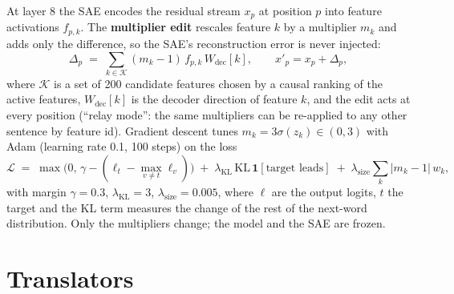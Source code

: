 At layer 8 the SAE encodes the residual stream $x_p$ at position $p$ into feature activations $f_{p,k}$. The \textbf{multiplier edit} rescales feature $k$ by a multiplier $m_k$ and adds only the difference, so the SAE's reconstruction error is never injected:
\begin{equation}\label{eq:delta}
\Delta_p \;=\; \sum_{k\in\mathcal{K}} (m_k - 1)\, f_{p,k}\, W_{\mathrm{dec}}[k], \qquad x'_p = x_p + \Delta_p ,
\end{equation}
where $\mathcal{K}$ is a set of 200 candidate features chosen by a causal ranking of the active features, $W_{\mathrm{dec}}[k]$ is the decoder direction of feature $k$, and the edit acts at every position (``relay mode'': the same multipliers can be re-applied to any other sentence by feature id). Gradient descent tunes $m_k = 3\sigma(z_k)\in(0,3)$ with Adam \cite{r36} (learning rate 0.1, 100 steps) on the loss
\begin{equation}\label{eq:loss}
\mathcal{L} \;=\; \max\!\bigl(0,\,\gamma - (\ell_t - \max_{v\neq t}\ell_v)\bigr) \;+\; \lambda_{\mathrm{KL}}\,\mathrm{KL}\,\mathbf{1}[\text{target leads}] \;+\; \lambda_{\mathrm{size}}\sum_k |m_k-1|\,w_k ,
\end{equation}
with margin $\gamma=0.3$, $\lambda_{\mathrm{KL}}=3$, $\lambda_{\mathrm{size}}=0.005$, where $\ell$ are the output logits, $t$ the target and the KL term measures the change of the rest of the next-word distribution. Only the multipliers change; the model and the SAE are frozen.

\section{Translators}

